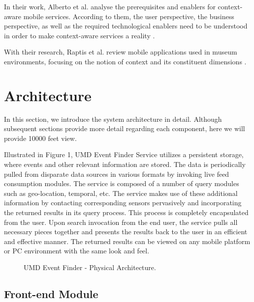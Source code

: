 \documentclass{acm_proc_article-sp}
\begin{document}
In their work, Alberto et al. analyse the prerequisites and enablers for context-aware mobile services. According to them,  the user perspective, the business perspective, as well as the required technological enablers need to be understood in order to make context-aware services a reality \cite{alberto:usercentric}.

With their research, Raptis et al. review mobile applications used in museum environments, focusing on the notion of context and its constituent dimensions \cite{raptis:museum}.

\section{Architecture}
In this section, we introduce the system architecture in detail. Although subsequent sections provide more detail regarding each component, here we will provide 10000 feet view.

Illustrated in Figure 1, UMD Event Finder Service utilizes a persistent storage, where events and other relevant information are stored. The data is periodically pulled from disparate data sources in various formats by invoking live feed consumption modules. The service is composed of a number of query modules such as geo-location, temporal, etc. The service makes use of these additional information by contacting corresponding sensors pervasively and incorporating the returned results in its query process. This process is completely encapsulated from the user. Upon search invocation from the end user, the service pulls all necessary pieces together and presents the results back to the user in an efficient and effective manner. The returned results can be viewed on any mobile platform or PC environment with the same look and feel.

\begin{figure*}
\centering
{}
\caption{UMD Event Finder - Physical Architecture.}
\end{figure*}

\subsection{Front-end Module}	 
\label{frontEnd}
\end{document}
